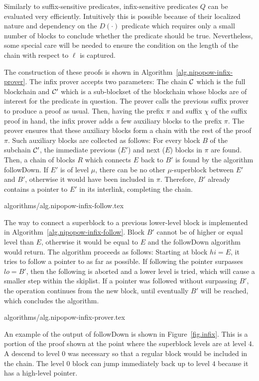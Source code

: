 Similarly to suffix-sensitive predicates, infix-sensitive predicates $Q$ can be evaluated very efficiently. Intuitively this is possible because
of their localized nature and dependency on the $D(\cdot)$ predicate which
requires only a small number of blocks to conclude whether the predicate should
be true. Nevertheless, some special care will be needed to ensure the condition
on the length  of the chain with respect to $\ell$ is captured. 

The construction of these proofs is shown in
Algorithm~\ref{alg.nipopow-infix-prover}. The infix prover accepts two
parameters: The chain $\mathcal{C}$ which is the full blockchain and $\mathcal{C}'$ which
is a sub-blockset of the blockchain whose blocks are of interest for the
predicate in question. The prover calls the previous suffix prover to produce a
proof as usual. Then, having the prefix $\pi$ and suffix $\chi$ of the suffix
proof in hand, the infix prover adds a few auxiliary blocks to the prefix $\pi$.
The prover ensures that these auxiliary blocks form a chain with the rest of the
proof $\pi$. Such auxiliary blocks are collected as follows: For every block $B$
of the subchain $\mathcal{C}'$, the immediate previous ($E'$) and next ($E$) blocks
in $\pi$ are found. Then, a chain of blocks $R$ which connects $E$ back to $B'$
is found by the algorithm followDown. If $E'$ is of level $\mu$, there can be no
other $\mu$-superblock between $E'$ and $B'$, otherwise it would have been
included in $\pi$. Therefore, $B'$ already contains a pointer to $E'$ in its
interlink, completing the chain.

{algorithms/alg.nipopow-infix-follow.tex}

The way to connect a superblock to a previous lower-level block is implemented
in Algorithm~\ref{alg.nipopow-infix-follow}.  Block $B'$ cannot be of higher or
equal level than $E$, otherwise it would be equal to $E$ and the followDown
algorithm would return. The algorithm proceeds as follows: Starting at block $hi =
E$, it tries to follow a pointer to as far as possible. If following the pointer
surpasses $lo = B'$, then the following is aborted and a lower level is tried,
which will cause a smaller step within the skiplist. If a pointer was followed
without surpassing $B'$, the operation continues from the new block, until
eventually $B'$ will be reached, which concludes the algorithm.

{algorithms/alg.nipopow-infix-prover.tex}

An example of the output of followDown is shown in Figure~\ref{fig.infix}. This
is a portion of the proof shown at the point where the superblock levels are at
level $4$. A descend to level $0$ was necessary so that a regular block would be
included in the chain. The level $0$ block can jump immediately back up to level
$4$ because it has a high-level pointer.

